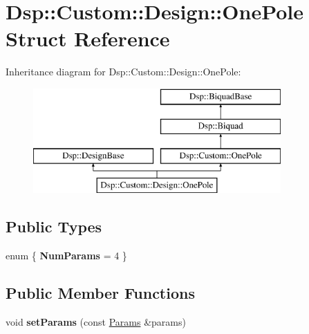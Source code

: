 \hypertarget{structDsp_1_1Custom_1_1Design_1_1OnePole}{\section{Dsp\-:\-:Custom\-:\-:Design\-:\-:One\-Pole Struct Reference}
\label{structDsp_1_1Custom_1_1Design_1_1OnePole}
}
Inheritance diagram for Dsp\-:\-:Custom\-:\-:Design\-:\-:One\-Pole\-:\begin{figure}[H]
\begin{center}
\leavevmode
\includegraphics[height=4.000000cm]{structDsp_1_1Custom_1_1Design_1_1OnePole}
\end{center}
\end{figure}
\subsection*{Public Types}
\begin{DoxyCompactItemize}
\item 
enum \{ {\bfseries Num\-Params} =  4
 \}
\end{DoxyCompactItemize}
\subsection*{Public Member Functions}
\begin{DoxyCompactItemize}
\item 
\hypertarget{structDsp_1_1Custom_1_1Design_1_1OnePole_a37d124ab3c924bf5c1fb0bc0a071440e}{void {\bfseries set\-Params} (const \hyperlink{structDsp_1_1Params}{Params} \&params)}\label{structDsp_1_1Custom_1_1Design_1_1OnePole_a37d124ab3c924bf5c1fb0bc0a071440e}

\end{DoxyCompactItemize}
